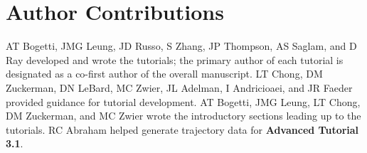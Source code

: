 \section{Author Contributions}
AT Bogetti, JMG Leung, JD Russo, S Zhang, JP Thompson, AS Saglam, and D Ray developed and wrote the tutorials; the primary author of each tutorial is designated as a co-first author of the overall manuscript. 
LT Chong, DM Zuckerman, DN LeBard, MC Zwier, JL Adelman, I Andricioaei, and JR Faeder provided guidance for tutorial development. 
AT Bogetti, JMG Leung, LT Chong, DM Zuckerman, and MC Zwier wrote the introductory sections leading up to the tutorials. 
RC Abraham helped generate trajectory data for \textbf{Advanced Tutorial 3.1}.
